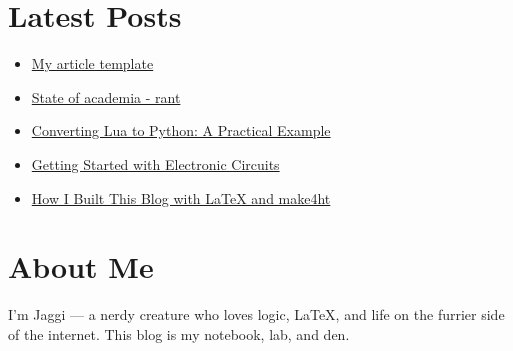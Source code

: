 \documentclass{article}
\begin{document}
\section*{Latest Posts}

\begin{itemize}
  \item \href{posts/article-template.html}{My article template}
  \item \href{posts/state-of-academia.html}{State of academia - rant}
  \item \href{posts/lua-to-python.html}{Converting Lua to Python: A
    Practical Example}
  \item \href{posts/electronic-circuits.html}{Getting Started with
    Electronic Circuits}
  \item \href{posts/latex-make4ht.html}{How I Built This Blog with
    LaTeX and make4ht}
\end{itemize}

\section*{About Me}

I'm Jaggi — a nerdy creature who loves logic, LaTeX, and life on the
furrier side of the internet. This blog is my notebook, lab, and den.
\end{document}
